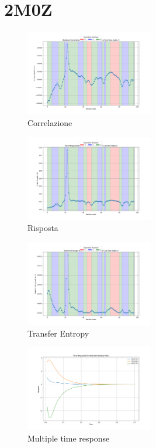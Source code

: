 \documentclass{article}
\begin{document}
\section{2M0Z}
\begin{figure}[H]
    \centering
    \includegraphics[width=0.5\textwidth]{images/2m0zResidual Correlation C_ij for i=22 as a function of j at time index 0.png}
    \caption{Correlazione}
\end{figure}
\begin{figure}[H]
    \centering
    \includegraphics[width=0.5\textwidth]{"images/2m0zTime Response R_ij for i=22 as a function of j at time index 0.png"}
    \caption{Risposta}
\end{figure}

\begin{figure}[H]
    \centering
    \includegraphics[width=0.5\textwidth]{"images/2m0zTransfer Entropy TE_ij for i=22 as a function of j at time index 0.png"}
    \caption{Transfer Entropy}
\end{figure}
\begin{figure}[H]
    \centering
    \includegraphics[width=0.5\textwidth]{"images/2m0zMultiple_time_resposne.png"}
    \caption{Multiple time response}
\end{figure}
\end{document}
